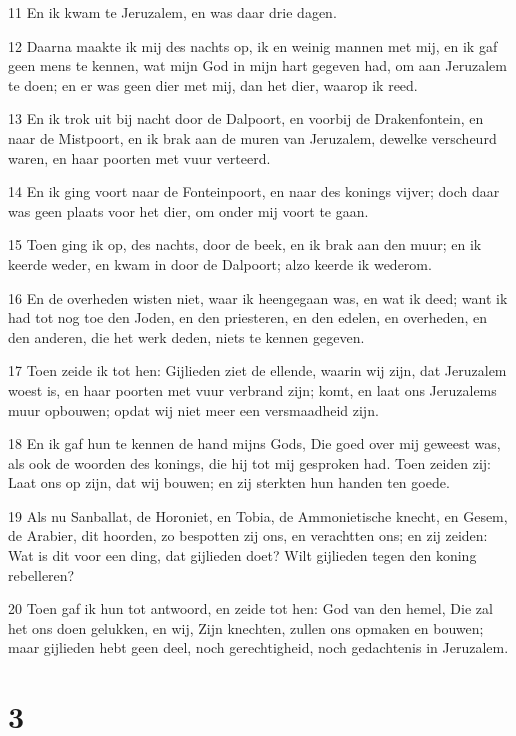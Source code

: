 \par 11 En ik kwam te Jeruzalem, en was daar drie dagen.
\par 12 Daarna maakte ik mij des nachts op, ik en weinig mannen met mij, en ik gaf geen mens te kennen, wat mijn God in mijn hart gegeven had, om aan Jeruzalem te doen; en er was geen dier met mij, dan het dier, waarop ik reed.
\par 13 En ik trok uit bij nacht door de Dalpoort, en voorbij de Drakenfontein, en naar de Mistpoort, en ik brak aan de muren van Jeruzalem, dewelke verscheurd waren, en haar poorten met vuur verteerd.
\par 14 En ik ging voort naar de Fonteinpoort, en naar des konings vijver; doch daar was geen plaats voor het dier, om onder mij voort te gaan.
\par 15 Toen ging ik op, des nachts, door de beek, en ik brak aan den muur; en ik keerde weder, en kwam in door de Dalpoort; alzo keerde ik wederom.
\par 16 En de overheden wisten niet, waar ik heengegaan was, en wat ik deed; want ik had tot nog toe den Joden, en den priesteren, en den edelen, en overheden, en den anderen, die het werk deden, niets te kennen gegeven.
\par 17 Toen zeide ik tot hen: Gijlieden ziet de ellende, waarin wij zijn, dat Jeruzalem woest is, en haar poorten met vuur verbrand zijn; komt, en laat ons Jeruzalems muur opbouwen; opdat wij niet meer een versmaadheid zijn.
\par 18 En ik gaf hun te kennen de hand mijns Gods, Die goed over mij geweest was, als ook de woorden des konings, die hij tot mij gesproken had. Toen zeiden zij: Laat ons op zijn, dat wij bouwen; en zij sterkten hun handen ten goede.
\par 19 Als nu Sanballat, de Horoniet, en Tobia, de Ammonietische knecht, en Gesem, de Arabier, dit hoorden, zo bespotten zij ons, en verachtten ons; en zij zeiden: Wat is dit voor een ding, dat gijlieden doet? Wilt gijlieden tegen den koning rebelleren?
\par 20 Toen gaf ik hun tot antwoord, en zeide tot hen: God van den hemel, Die zal het ons doen gelukken, en wij, Zijn knechten, zullen ons opmaken en bouwen; maar gijlieden hebt geen deel, noch gerechtigheid, noch gedachtenis in Jeruzalem.

\chapter{3}

